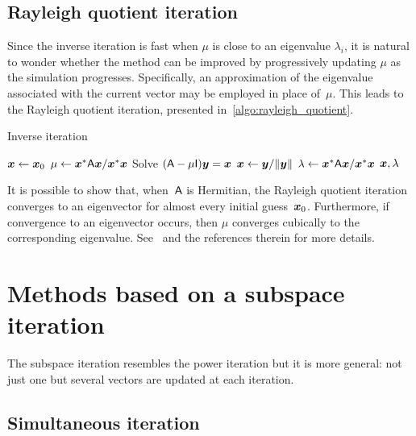 \subsection{Rayleigh quotient iteration}
Since the inverse iteration is fast when $\mu$ is close to an eigenvalue $\lambda_i$,
it is natural to wonder whether the method can be improved by progressively updating $\mu$ as the simulation progresses.
Specifically, an approximation of the eigenvalue associated with the current vector may be employed in place of~$\mu$.
This leads to the Rayleigh quotient iteration,
presented in~\cref{algo:rayleigh_quotient}.
\begin{algorithm}
\caption{Inverse iteration}%
\label{algo:rayleigh_quotient}%
\begin{algorithmic}
\State $\mathbf{\boldsymbol{x}} \gets \mathbf{\boldsymbol{x}}_0$
    \State $\mu \gets \mathbf{\boldsymbol{x}}^* \mathsf A \mathbf{\boldsymbol{x}} / \mathbf{\boldsymbol{x}}^* \mathbf{\boldsymbol{x}}$
    \State Solve $(\mathsf A - \mu \mathsf I) \mathbf{\boldsymbol{y}} = \mathbf{\boldsymbol{x}}$
    \State $\mathbf{\boldsymbol{x}} \gets \mathbf{\boldsymbol{y}} / \lVert\mathbf{\boldsymbol{y}}\rVert$
\EndFor
\State $\lambda \gets \mathbf{\boldsymbol{x}}^* \mathsf A \mathbf{\boldsymbol{x}} / \mathbf{\boldsymbol{x}}^* \mathbf{\boldsymbol{x}}$
\State \Return $\mathbf{\boldsymbol{x}}, \lambda$
\end{algorithmic}
\end{algorithm}

It is possible to show that, when~$\mathsf A$ is Hermitian,
the Rayleigh quotient iteration converges to an eigenvector for almost every initial guess~$\mathbf{\boldsymbol{x}}_0$.
Furthermore, if convergence to an eigenvector occurs,
then $\mu$ converges cubically to the corresponding eigenvalue.
See~\cite{MR3396212} and the references therein for more details.

\section{Methods based on a subspace iteration}
\label{sec:subspace_iteration}
The subspace iteration resembles the power iteration but it is more general:
not just one but several vectors are updated at each iteration.

\subsection{Simultaneous iteration}
\label{sub:simultaneous_iteration}

